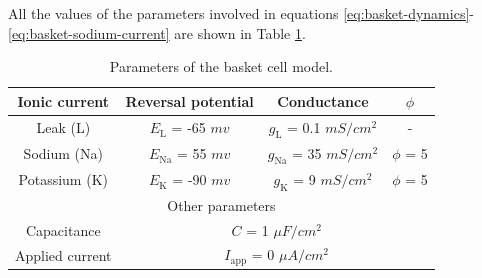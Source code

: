 \documentclass[../main.tex]{subfiles}
\begin{document}
All the values of the parameters involved in equations \eqref{eq:basket-dynamics}-\eqref{eq:basket-sodium-current} are shown in Table \ref{table:basket-parameters}.
\begin{table}[htb]
\def\arraystretch{1.4}%
\caption{Parameters of the basket cell model.}
\begin{center}
\begin{tabular}{|c|c|c|c|}
    \hline
    Ionic current & Reversal potential & Conductance & $\phi$ \\ \hline
    Leak (L)      & $E_{\text{L}}$ = -65 $mv$ & $g_{\text{L}}$  = 0.1 $mS/cm^2$ & -\\ \hline
    Sodium (Na)   & $E_{\text{Na}}$ = 55 $mv$ & $g_{\text{Na}}$ = 35 $mS/cm^2$  & $\phi$ = 5\\ \hline
    Potassium (K) & $E_{\text{K}}$ = -90 $mv$ & $g_{\text{K}}$  = 9 $mS/cm^2$   & $\phi$ = 5\\ \hline
    \multicolumn{4}{|c|}{Other parameters}\\ \hline
    Capacitance      &  \multicolumn{3}{c|}{$C$ = 1 $\mu F/cm^2$} \\ \hline
    Applied current  &  \multicolumn{3}{c|}{$I_{\text{app}}$ = 0 $\mu A/cm^2$}\\
    \hline
\end{tabular}
\label{table:basket-parameters}
\end{center}
\end{table}
\end{document}
